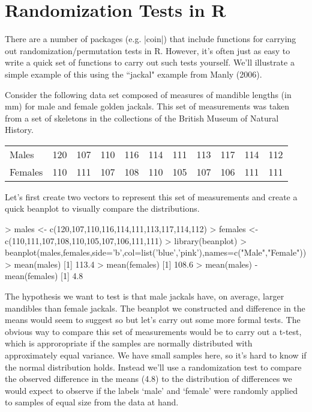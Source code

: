 

\section{Randomization Tests in R}


There are a number of packages (e.g. |coin|) that include functions for carrying out randomization/permutation tests in R. However, it's often just as easy to write a quick set of functions to carry out such tests yourself. We'll illustrate a simple example of this using the ``jackal" example from Manly (2006).

Consider the following data set composed of measures of mandible lengths (in mm) for male and female golden jackals. This set of measurements was taken from a set of skeletons in the collections of the British Museum of Natural History.

\begin{center}
\begin{tabular}{lrrrrrrrrrr}
\hline
Males & 120 & 107 & 110 & 116 & 114 & 111 & 113 & 117 & 114 & 112 \\
Females & 110 & 111 & 107 & 108 & 110 & 105 & 107 & 106 & 111 & 111\\
\hline
\end{tabular}    
\end{center}

Let's first create two vectors to represent this set of measurements and create a quick beanplot to visually compare the distributions.

\begin{R}
> males <- c(120,107,110,116,114,111,113,117,114,112)
> females <- c(110,111,107,108,110,105,107,106,111,111)    
> library(beanplot)
> beanplot(males,females,side='b',col=list('blue','pink'),names=c("Male","Female"))
> mean(males)
[1] 113.4
> mean(females)
[1] 108.6
> mean(males) - mean(females)
[1] 4.8
\end{R}

The hypothesis we want to test is that male jackals have, on average, larger mandibles than female jackals. The beanplot we constructed and difference in the means would seem to suggest so but let's carry out some more formal tests. The obvious way to compare this set of measurements would be to carry out a t-test, which is approropriate if the samples are normally distributed with approximately equal variance. We have small samples here, so it's hard to know if the normal distribution holds. Instead we'll use a randomization test to compare the observed difference in the means (4.8) to the distribution of differences we would expect to observe if the labels `male' and `female' were randomly applied to samples of equal size from the data at hand.

